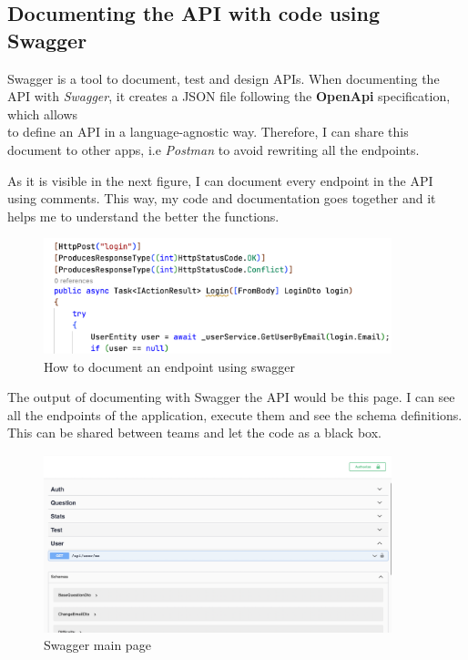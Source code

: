     \subsection{Documenting the API with code using Swagger}
        Swagger \cite{Swagger} is a tool to document, test and design APIs. When documenting the API with \textit{Swagger}, it creates a JSON file following the \textbf{OpenApi} specification, which allows \\
        to define an API in a language-agnostic way. Therefore, I can share this document to other apps, i.e \textit{Postman} to avoid rewriting all the endpoints.

        As it is visible in the next figure, I can document every endpoint in the API using comments. This way, my code and documentation goes together and it helps me to understand the better the functions. \\
        \begin{figure}[H]
            \centering
                \includegraphics[width=0.9\textwidth]{assets/swagger_comment.png}
            \caption{How to document an endpoint using swagger}
            \label{fig:impl_swagger_endpoint}
        \end{figure}

        The output of documenting with Swagger the API would be this page. I can see all the endpoints of the application, execute them and see the schema definitions. This can be shared between teams and let the code as a black box. 
        \begin{figure}[H]
            \centering
                \includegraphics[width=0.9\textwidth]{assets/swagger.png}
            \caption{Swagger main page}
            \label{fig:impl_swagger}
        \end{figure}

